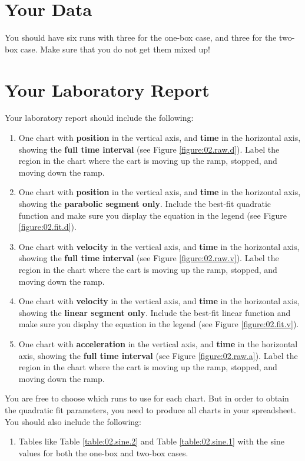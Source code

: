 \section{Your Data}
You should have six runs with three for the one-box case, and three for the two-box case. Make sure that you do not get them mixed up!
\section{Your Laboratory Report}
Your laboratory report should include the following:
\begin{enumerate}
    \item One chart with \textbf{position} in the vertical axis, and \textbf{time} in the horizontal axis, showing the \textbf{full time interval} (see Figure \ref{figure:02.raw.d}). Label the region in the chart where the cart is moving up the ramp, stopped, and moving down the ramp.
    \item One chart with \textbf{position} in the vertical axis, and \textbf{time} in the horizontal axis, showing the \textbf{parabolic segment only}. Include the best-fit quadratic function and make sure you display the equation in the legend (see Figure \ref{figure:02.fit.d}). 
    \item One chart with \textbf{velocity} in the vertical axis, and \textbf{time} in the horizontal axis, showing the \textbf{full time interval} (see Figure \ref{figure:02.raw.v}). Label the region in the chart where the cart is moving up the ramp, stopped, and moving down the ramp.
    \item One chart with \textbf{velocity} in the vertical axis, and \textbf{time} in the horizontal axis, showing the \textbf{linear segment only}. Include the best-fit linear function and make sure you display the equation in the legend (see Figure \ref{figure:02.fit.v}).
    \item One chart with \textbf{acceleration} in the vertical axis, and \textbf{time} in the horizontal axis, showing the \textbf{full time interval} (see Figure \ref{figure:02.raw.a}). Label the region in the chart where the cart is moving up the ramp, stopped, and moving down the ramp.
\end{enumerate}
You are free to choose which runs to use for each chart. But in order to obtain the quadratic fit parameters, you need to produce all charts in your spreadsheet. You should also include the following:
\begin{enumerate}
    \item Tables like Table \ref{table:02.sine.2} and Table \ref{table:02.sine.1} with the sine values for both the one-box and two-box cases.
\end{enumerate}
\newpage
